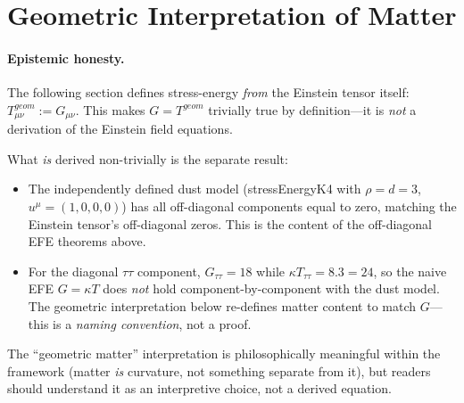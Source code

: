 \documentclass[11pt,a4paper]{book}
\def\cdot{.}%
\def\texttt#1{#1}%
\def\text#1{#1}%
\begin{document}
\section{Geometric Interpretation of Matter}

\paragraph{Epistemic honesty.}
The following section defines stress-energy \emph{from} the Einstein tensor itself:
$T^{\text{geom}}_{\mu\nu} := G_{\mu\nu}$. This makes $G = T^{\text{geom}}$ trivially
true by definition---it is \emph{not} a derivation of the Einstein field equations.

What \emph{is} derived non-trivially is the separate result:
\begin{itemize}
\item The independently defined dust model (\texttt{stressEnergyK4} with $\rho = d = 3$,
  $u^\mu = (1,0,0,0)$) has all off-diagonal components equal to zero,
  matching the Einstein tensor's off-diagonal zeros. This is the content of
  the off-diagonal EFE theorems above.
\item For the diagonal $\tau\tau$ component, $G_{\tau\tau} = 18$ while
  $\kappa T_{\tau\tau} = 8 \cdot 3 = 24$, so the naive EFE $G = \kappa T$
  does \emph{not} hold component-by-component with the dust model.
  The geometric interpretation below re-defines matter content to match
  $G$---this is a \emph{naming convention}, not a proof.
\end{itemize}

The ``geometric matter'' interpretation is philosophically meaningful within the
framework (matter \emph{is} curvature, not something separate from it), but
readers should understand it as an interpretive choice, not a derived equation.
\end{document}
